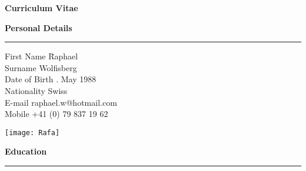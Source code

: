 


\graphicspath{{./Pictures/}}





\newpage
\pagestyle{empty}
\vspace{-9cm}

\huge
\textbf{Curriculum Vitae}

\bigskip
\bigskip
\large
\textbf{Personal Details}
\noindent\rule[3mm]{\linewidth}{1pt}

\normalsize
\vspace{0.2cm}
\begin{tabbing}
First Name \hspace*{2.4cm} \= Raphael \\
Surname \> Wolfisberg \\
Date of Birth . May 1988 \\
Nationality \> Swiss \\ [0.2 cm]
E-mail \> raphael.w@hotmail.com \\
Mobile \> +41 (0) 79 837 19 62 
\end{tabbing}

\begin{addmargin}{0.03\textwidth}
\vspace{-4.55 cm}
\begin{flushright}
\texttt{[image: Rafa]} \\[1cm]
\end{flushright}
\end{addmargin}


\vspace{-1.2cm}
\large
\textbf{Education}
\noindent\rule[3mm]{\linewidth}{1pt}

